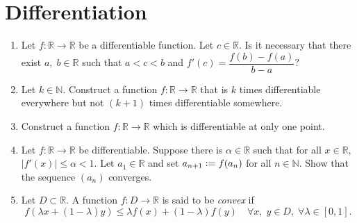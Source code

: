 \documentclass{article}
\begin{document}
\section{Differentiation}
\begin{enumerate} 
	\item Let $f:\mathbb{R}\to\mathbb{R}$ be a differentiable function. Let $c \in \mathbb{R}.$ Is it necessary that there exist $a,\;b \in \mathbb{R}$ such that $a < c < b$ and $f'(c) = \dfrac{f(b) - f(a)}{b - a}?$
	\item Let $k\in \mathbb{N}.$ Construct a function $f:\mathbb{R}\to\mathbb{R}$ that is $k$ times differentiable everywhere but not $(k+1)$ times differentiable somewhere.
	\item Construct a function $f:\mathbb{R}\to\mathbb{R}$ which is differentiable at only one point.
	\item Let $f:\mathbb{R}\to\mathbb{R}$ be differentiable. Suppose there is $\alpha \in \mathbb{R}$ such that for all $x \in \mathbb{R},$ $|f'(x)| \le \alpha < 1.$ Let $a_1 \in \mathbb{R}$ and set $a_{n+1} \vcentcolon= f(a_n)$ for all $n \in \mathbb{N}.$ Show that the sequence $(a_n)$ converges.
	\item Let $D \subset \mathbb{R}.$ A function $f:D\to \mathbb{R}$ is said to be \emph{convex} if
	\[f(\lambda x + (1 - \lambda)y) \le \lambda f(x) + (1 - \lambda)f(y) \quad \forall x,\;y\in D,\;\forall \lambda\in [0, 1].\]
	

\end{enumerate}
\end{document}

